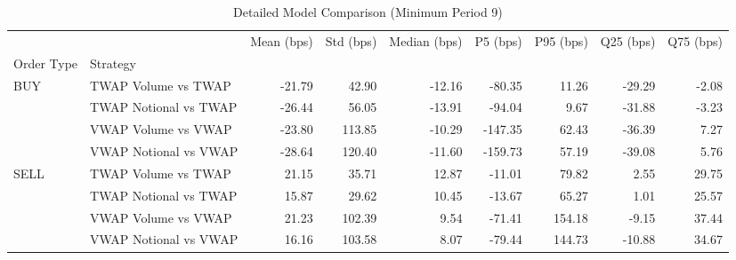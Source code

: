 \begin{table}
\caption{Detailed Model Comparison (Minimum Period 9)}
\label{tab:detailed_min_period_9}
\begin{tabular}{l|l|rrrrrrr}
\toprule
 &  & Mean (bps) & Std (bps) & Median (bps) & P5 (bps) & P95 (bps) & Q25 (bps) & Q75 (bps) \\
Order Type & Strategy &  &  &  &  &  &  &  \\
\midrule
\multirow[t]{4}{*}{BUY} & TWAP Volume vs TWAP & -21.79 & 42.90 & -12.16 & -80.35 & 11.26 & -29.29 & -2.08 \\
 & TWAP Notional vs TWAP & -26.44 & 56.05 & -13.91 & -94.04 & 9.67 & -31.88 & -3.23 \\
 & VWAP Volume vs VWAP & -23.80 & 113.85 & -10.29 & -147.35 & 62.43 & -36.39 & 7.27 \\
 & VWAP Notional vs VWAP & -28.64 & 120.40 & -11.60 & -159.73 & 57.19 & -39.08 & 5.76 \\
\cline{1-9}
\multirow[t]{4}{*}{SELL} & TWAP Volume vs TWAP & 21.15 & 35.71 & 12.87 & -11.01 & 79.82 & 2.55 & 29.75 \\
 & TWAP Notional vs TWAP & 15.87 & 29.62 & 10.45 & -13.67 & 65.27 & 1.01 & 25.57 \\
 & VWAP Volume vs VWAP & 21.23 & 102.39 & 9.54 & -71.41 & 154.18 & -9.15 & 37.44 \\
 & VWAP Notional vs VWAP & 16.16 & 103.58 & 8.07 & -79.44 & 144.73 & -10.88 & 34.67 \\
\cline{1-9}
\bottomrule
\end{tabular}
\end{table}
